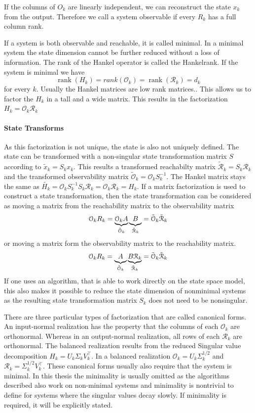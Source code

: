\documentclass[doctype=mastersthesis,BCOR=15mm,biblatex]{ldvbook}%
\DeclareMathOperator{\rank}{rank}
\newcommand{\R}{\mathcal{R}} %
\newcommand{\Ob}{\mathcal{O}} %
\begin{document}
If the columns of $O_k$ are linearly independent, we can reconstruct the state $x_k$ from the output.  
Therefore we call a system observable if every $R_k$ has a full column rank.

If a system is both observable and reachable, it is called minimal.
In a minimal system the state dimension cannot be further reduced without a loss of information.
The rank of the Hankel operator is called the Hankelrank. 
If the system is minimal we have 
\begin{equation}
	\rank(H_k) = rank(\Ob_k) = \rank(\R_k) = d_k
\end{equation}
for every $k$.
Usually the Hankel matrices are low rank matrices..
This allows us to factor the $H_k$ in a tall and a wide matrix. 
This results in the factorization $H_k = \Ob_k\R_k$

\paragraph{State Transforms}
As this factorization is not unique, the state is also not uniquely defined. 
The state can be transformed with a non-singular state transformation matrix $S$ according to $\tilde{x}_k =S_kx_k$.
This results a transformed 
reachabilty matrix $\tilde{\R}_k=S_k \R_k$ and the transformed
observability matrix $\tilde{\Ob}_k= \Ob_k S_k^{-1}$. 
The Hankel matrix stays the same as $\tilde{H_k} = \Ob_k S_k^{-1} S_k \R_k= \Ob_k \R_k = H_k$.
If a matrix factorization is used to construct a state transformation, then the state transformation can be considered as moving a matrix from the reachability matrix to the observability matrix
\begin{equation}
	\Ob_{k}R_{k} = \underbrace{\Ob_{k}A}_{\tilde{\Ob}_k}\underbrace{B\vphantom{\Ob_k}}_{\tilde{\R}_k} = \tilde{\Ob}_k\tilde{\R}_k
\end{equation}
or moving a matrix form the observability matrix to the reachability matrix.
\begin{equation}
\Ob_{k}R_{k} = \underbrace{A\vphantom{\R_k}}_{\tilde{\Ob}_k}\underbrace{B\R_{k}}_{\tilde{\R}_k} = \tilde{\Ob}_k\tilde{\R}_k
\end{equation}
If one uses an algorithm, that is able to work directly on the state space model, this also makes it possible to reduce the state dimension of nonminimal systems as the resulting state transformation matrix $S_k$ does not need to be nonsingular.

There are three particular types of factorization that are called canonical forms.
An input-normal realization has the property that the columns of each $\Ob_k$ are orthonormal. Whereas in an output-normal realization, all rows of each $\R_k$ are orthonormal.
The balanced realization results from the reduced Singular value decomposition $H_k = U_k \Sigma_k V_k^\top$. 
In a balanced realization $\Ob_k = U_k \Sigma^{1/2}_k$ and $\R_k = \Sigma^{1/2}_k V_k^\top$.
These canonical forms usually also require that the system is minimal. In this thesis the minimality is usually omitted as the algorithms described also work on non-minimal systems and minimality is nontrivial to define for systems where the singular values decay slowly. If minimality is required, it will be explicitly stated.
\end{document}
